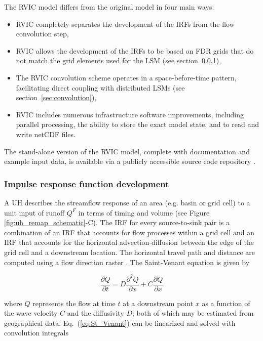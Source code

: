 \documentclass[jgrga, draft]{agutex}
\begin{document}
\begin{article}
The RVIC model differs from the original \citet{Lohmann_1996} model in four main ways:

\begin{itemize}[leftmargin=+.5in]
\item RVIC completely separates the development of the IRFs from the flow convolution step,
\item RVIC allows the development of the IRFs to be based on FDR grids that do not match the grid elements used for the LSM (see section~\ref{sec:irfs}),
\item The RVIC convolution scheme operates in a space-before-time pattern, facilitating direct coupling with distributed LSMs (see section~\ref{sec:convolution}),
\item RVIC includes numerous infrastructure software improvements, including parallel processing, the ability to store the exact model state, and to read and write netCDF files.
\end{itemize}

The stand-alone version of the RVIC model, complete with documentation and example input data, is available via a publicly accessible source code repository \citep{Hamman_2015}.

\subsubsection{Impulse response function development}
\label{sec:irfs}

A UH describes the streamflow response of an area (e.g. basin or grid cell) to a unit input of runoff $Q^F$ in terms of timing and volume (see Figure \ref{fig:uh_remap_schematic}-C).
The IRF for every source-to-sink pair is a combination of an IRF that accounts for flow processes within a grid cell and an IRF that accounts for the horizontal advection-diffusion between the edge of the grid cell and a downstream location.
The horizontal travel path and distance are computed using a flow direction raster \citep[e.g.][]{Wu_2011}.
The Saint-Venant equation is given by

 \begin{equation}
   \label{eq:St_Venant}
   \frac{\partial Q}{\partial t} = D \frac{\partial^2 Q}{\partial x} + C \frac{\partial Q}{\partial x}
 \end{equation}

where $Q$ represents the flow at time $t$ at a downstream point $x$ as a function of the wave velocity $C$ and the diffusivity $D$; both of which may be estimated from geographical data.
Eq.~(\ref{eq:St_Venant}) can be linearized and solved with convolution integrals


\end{article}
\end{document}
